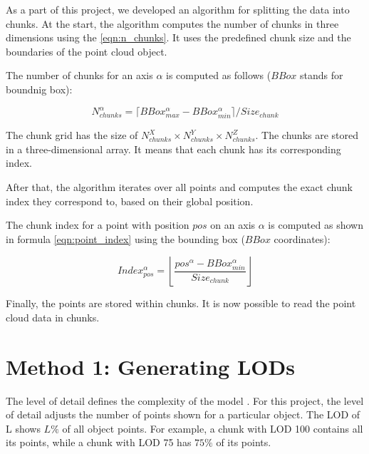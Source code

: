 As a part of this project, we developed an algorithm for splitting the data into chunks. At the start, the algorithm computes the number of chunks in three dimensions using the \autoref{eqn:n_chunks}. It uses the predefined chunk size and the boundaries of the point cloud object.

The number of chunks for an axis $\alpha$ is computed as follows ($BBox$ stands for boundnig box):

\begin{equation}
\label{eqn:n_chunks}
N_{chunks}^\alpha = \lceil BBox_{max}^\alpha - BBox_{min}^\alpha \rceil / Size_{chunk}
\end{equation}

The chunk grid has the size of $N_{chunks}^X \times N_{chunks}^Y \times N_{chunks}^Z$. The chunks are stored in a three-dimensional array. It means that each chunk has its corresponding index.

After that, the algorithm iterates over all points and computes the exact chunk index they correspond to, based on their global position.


The chunk index for a point with position $pos$ on an axis $\alpha$ is computed as shown in formula \ref{eqn:point_index} using the bounding box ($BBox$ coordinates):

\begin{equation}
\label{eqn:point_index}
Index_{pos}^\alpha = \left \lfloor \frac{pos^{\alpha} - BBox_{min}^\alpha}{Size_{chunk}} \right \rfloor
\end{equation}

Finally, the points are stored within chunks. It is now possible to read the point cloud data in chunks.


\section{Method 1: Generating LODs}
\label{sec:generating_lods}

The level of detail defines the complexity of the model \cite{Luebke2002}. For this project, the level of detail adjusts the number of points shown for a particular object.
The LOD of L shows $L\%$ of all object points. For example, a chunk with LOD 100 contains all its points, while a chunk with LOD 75 has $75\%$ of its points.

